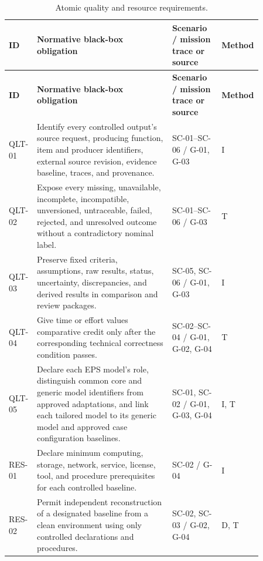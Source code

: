 \documentclass[11pt,a4paper]{article}
\begin{document}
\begin{longtable}{>{\raggedright\arraybackslash}p{0.07\linewidth} >{\raggedright\arraybackslash}p{0.52\linewidth} >{\raggedright\arraybackslash}p{0.19\linewidth} >{\raggedright\arraybackslash}p{0.08\linewidth}}
    \caption{Atomic quality and resource requirements.}\label{tab:framework-quality-resource-requirements}\\
    \toprule
    \textbf{ID} & \textbf{Normative black-box obligation} & \textbf{Scenario / mission trace or source} & \textbf{Method} \\
    \midrule
    \endfirsthead
    \toprule
    \textbf{ID} & \textbf{Normative black-box obligation} & \textbf{Scenario / mission trace or source} & \textbf{Method} \\
    \midrule
    \endhead
    QLT-01 & Identify every controlled output's source request, producing function, item and producer identifiers, external source revision, evidence baseline, traces, and provenance. & SC-01--SC-06 / G-01, G-03 & I \\
    QLT-02 & Expose every missing, unavailable, incomplete, incompatible, unversioned, untraceable, failed, rejected, and unresolved outcome without a contradictory nominal label. & SC-01--SC-06 / G-03 & T \\
    QLT-03 & Preserve fixed criteria, assumptions, raw results, status, uncertainty, discrepancies, and derived results in comparison and review packages. & SC-05, SC-06 / G-01, G-03 & I \\
    QLT-04 & Give time or effort values comparative credit only after the corresponding technical correctness condition passes. & SC-02--SC-04 / G-01, G-02, G-04 & T \\
    QLT-05 & Declare each EPS model's role, distinguish common core and generic model identifiers from approved adaptations, and link each tailored model to its generic model and approved case configuration baselines. & SC-01, SC-02 / G-01, G-03, G-04 & I, T \\
    RES-01 & Declare minimum computing, storage, network, service, license, tool, and procedure prerequisites for each controlled baseline. & SC-02 / G-04 & I \\
    RES-02 & Permit independent reconstruction of a designated baseline from a clean environment using only controlled declarations and procedures. & SC-02, SC-03 / G-02, G-04 & D, T \\
    \bottomrule
\end{longtable}
\normalsize
\end{document}
